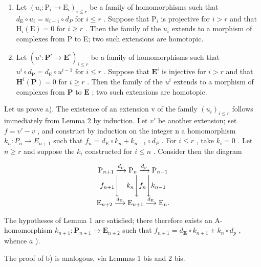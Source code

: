 \begin{enumerate}
\def\labelenumi{\alph{enumi})}
\item
  Let \((u_i: \mathrm{P}_i \to \mathrm{E}_i)_{i \leqslant r}\) be a family of homomorphisms such that \(d_{\mathrm{E}} \circ u_i = u_{i-1} \circ d_P\) for \(i \leqslant r\) . Suppose that \(\mathrm{P}_i\) is projective for \(i > r\) and that \(\mathrm{H}_i(\mathrm{E}) = 0\) for \(i \geqslant r\) . Then the family of the \(u_i\) extends to a morphism of complexes from P to E; two such extensions are homotopic.
\item
  Let \((u^{i}:\mathbf{P}^{i}\to\mathbf{E}^{i})_{i\leqslant r}\) be a family of homomorphisms such that \(u^{i}\circ d_{\mathrm{P}}=d_{\mathrm{E}}\circ u^{i-1}\) for \(i\leqslant r\) . Suppose that \(\mathbf{E}^{i}\) is injective for \(i>r\) and that \(\mathbf{H}^{i}(\mathbf{P})=0\) for \(i\geqslant r\) . Then the family of the \(u^{i}\) extends to a morphism of complexes from \(\mathbf{P}\) to \(\mathbf{E}\) ; two such extensions are homotopic.
\end{enumerate}

Let us prove a). The existence of an extension v of the family \((u_{i})_{i\leqslant r}\) follows immediately from Lemma 2 by induction. Let \(v'\) be another extension; set \(f=v'-v\) , and construct by induction on the integer n a homomorphism \(k_{n}:P_{n}\to E_{n+1}\) such that \(f_{n}=d_{E}\circ k_{n}+k_{n-1}\circ d_{P}\) . For \(i\leqslant r\) , take \(k_{i}=0\) . Let \(n\geqslant r\) and suppose the \(k_{i}\) constructed for \(i\leqslant n\) . Consider then the diagram

\[
\begin{array}{c} \mathrm{P} _ {n + 1} \xrightarrow {d _ {\mathrm{p}}} \mathrm{P} _ {n} \xrightarrow {d _ {\mathrm{p}}} \mathrm{P} _ {n - 1} \\ f _ {n + 1} \Biggl \downarrow \quad k _ {n} \Biggl \downarrow f _ {n} \Biggl \downarrow k _ {n - 1} \\ \mathrm{E} _ {n + 2} \xrightarrow {d _ {\mathrm{E}}} \mathrm{E} _ {n + 1} \xrightarrow {d _ {\mathrm{E}}} \mathrm{E} _ {n}. \end{array}
\]

The hypotheses of Lemma 1 are satisfied; there therefore exists an A-homomorphism \(k_{n+1}: \mathbf{P}_{n+1} \to \mathbf{E}_{n+2}\) such that \(f_{n+1} = d_{\mathbf{E}} \circ k_{n+1} + k_n \circ d_p\) , whence \(a\) ).

The proof of b) is analogous, via Lemmas 1 bis and 2 bis.

